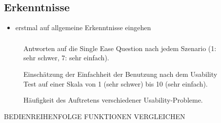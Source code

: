 \subsection{Erkenntnisse}

\begin{frame}
  \begin{itemize}
    \item erstmal auf allgemeine Erkenntnisse eingehen
  \end{itemize}
\end{frame}

\begin{frame}
  \frametitle{\currentsectionname}

  \begin{figure}
    
    \caption{Antworten auf die Single Ease Question nach jedem Szenario (1: sehr schwer, 7: sehr einfach).}
  \end{figure}


\end{frame}

\begin{frame}

  \begin{figure}
    
    \caption{Einschätzung der Einfachheit der Benutzung nach dem Usability Test auf einer Skala von 1 (sehr schwer) bis 10 (sehr einfach).}
  \end{figure}

\end{frame}

\begin{frame}

  \begin{figure}
    
    \caption{Häufigkeit des Auftretens verschiedener Usability-Probleme.}
  \end{figure}

\end{frame}

\begin{frame}

  BEDIENREIHENFOLGE FUNKTIONEN VERGLEICHEN

\end{frame}

